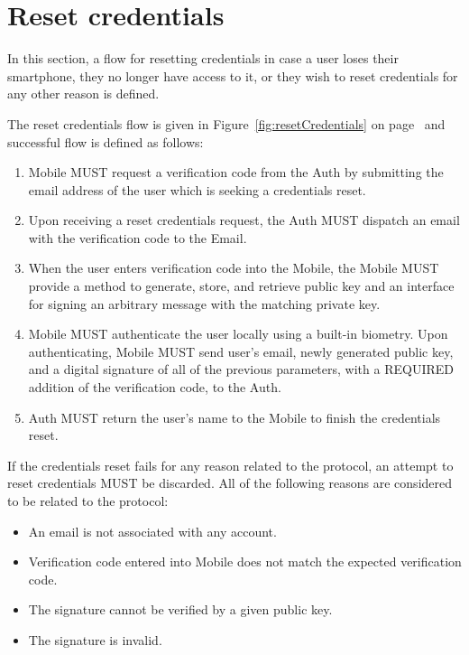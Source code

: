 \section{Reset credentials}
In this section, a flow for resetting credentials in case a user loses their smartphone, they no longer have access to it,
or they wish to reset credentials for any other reason is defined.
\medskip

The reset credentials flow is given in Figure~\ref{fig:resetCredentials} on page~\pageref{fig:resetCredentials} 
and successful flow is defined as follows:
    \begin{enumerate}
        \item Mobile MUST request a verification code from the Auth by submitting the email address of the user
                which is seeking a credentials reset.
        \item Upon receiving a reset credentials request, the Auth MUST dispatch an email with the verification
                code to the Email.
        \item When the user enters verification code into the Mobile, the Mobile MUST provide a method to generate,
                store, and retrieve public key and an interface for signing an arbitrary message with the matching 
                private key.
        \item Mobile MUST authenticate the user locally using a built-in biometry. Upon authenticating, Mobile 
                MUST send user's email, newly generated public key, and a digital signature of all of the previous 
                parameters, with a REQUIRED addition of the verification code, to the Auth.
        \item Auth MUST return the user's name to the Mobile to finish the credentials reset.
    \end{enumerate}
    
If the credentials reset fails for any reason related to the protocol, an attempt to reset credentials MUST 
be discarded. All of the following reasons are considered to be related to the protocol:
    \begin{itemize}
        \item An email is not associated with any account.
        \item Verification code entered into Mobile does not match the expected verification code.
        \item The signature cannot be verified by a given public key.
        \item The signature is invalid.
    \end{itemize}
